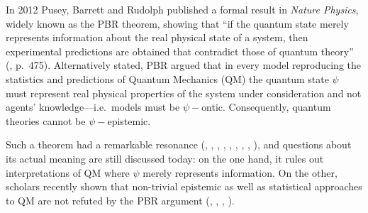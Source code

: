 \documentclass[twocolumn,prl,floatfix,superscriptaddress]{revtex4-2}
\begin{document}
 
In 2012 Pusey, Barrett and Rudolph published a formal result in \emph{Nature Physics}, widely known as the PBR theorem, showing that ``if the quantum state merely represents information about the real physical state of a system, then experimental predictions are obtained that contradict those of quantum theory'' (\cite{PBR:2012}, p.\ 475). Alternatively stated, PBR argued that in every model reproducing the statistics and predictions of Quantum Mechanics (QM) the quantum state $\psi$ must represent real physical properties of the system under consideration and not agents' knowledge---i.e.\ models must be $\psi-$ontic. Consequently, quantum theories cannot be $\psi-$epistemic. 

Such a theorem had a remarkable resonance (\cite{Leifer:2014, Leifer:2014b}, \cite{Renner:2012}, \cite{Colbeck:2017}, \cite{Hardy:2013}, \cite{Maroney:2014}, \cite{Patra:2013}, \cite{Mansfield:2016}, \cite{Schlosshauer:2012, Schlosshauer:2013, Schlosshauer:2014}, \cite{Aaronson:2013}), and questions about its actual meaning are still discussed today: on the one hand, it rules out interpretations of QM where $\psi$ merely represents information. On the other, scholars recently shown that non-trivial epistemic as well as statistical approaches to QM are not refuted by the PBR argument (\cite{Ben:2017}, \cite{Rizzi:2018}, \cite{Oldofredi:2021}, \cite{DeBrota:2019}).
	
\end{document}
